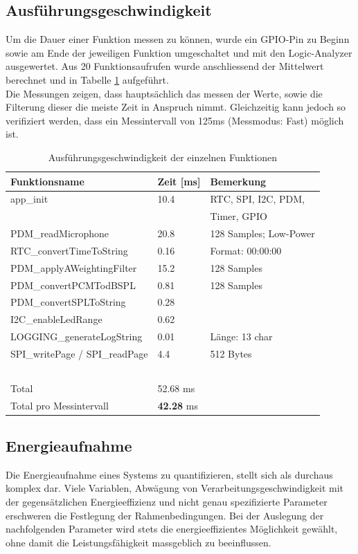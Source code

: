 \documentclass[12pt]{article}
\begin{document}
	\subsection{Ausführungsgeschwindigkeit}
	Um die Dauer einer Funktion messen zu können, wurde ein GPIO-Pin zu Beginn sowie am Ende der jeweiligen Funktion umgeschaltet und mit den Logic-Analyzer ausgewertet. Aus 20 Funktionsaufrufen wurde anschliessend der Mittelwert berechnet und in Tabelle \ref{tab:ausfuehrungsgeschwindigkeit} aufgeführt. \\
	Die Messungen zeigen, dass hauptsächlich das messen der Werte, sowie die Filterung dieser die meiste Zeit in Anspruch nimmt. Gleichzeitig kann jedoch so verifiziert werden, dass ein Messintervall von 125ms (Messmodus: Fast) möglich ist.
	\begin{table}[H]
		\centering
		\begin{tabular}{|l|l|l|}
			\hline
			\textbf{Funktionsname} & \textbf{Zeit [ms]} & \textbf{Bemerkung} \\ \hline
			app\_init & 10.4 & RTC, SPI, I2C, PDM, \\ 
			 ~ & ~ & Timer, GPIO \\ 
			 \hline
			PDM\_readMicrophone & 20.8 & 128 Samples; Low-Power \\ \hline
			RTC\_convertTimeToString & 0.16 & Format: 00:00:00 \\ \hline
			PDM\_applyAWeightingFilter & 15.2 & 128 Samples \\ \hline
			PDM\_convertPCMTodBSPL & 0.81 & 128 Samples \\ \hline
			PDM\_convertSPLToString & 0.28 & ~ \\ \hline
			I2C\_enableLedRange & 0.62 & ~ \\ \hline
			LOGGING\_generateLogString & 0.01 & Länge: 13 char \\ \hline
			SPI\_writePage / SPI\_readPage & 4.4 & 512 Bytes \\ \hline
			~ & ~ & ~ \\ \hline
			Total & 52.68 ms & ~ \\ \hline
			Total pro Messintervall & \textbf{42.28} ms & ~ \\ \hline
		\end{tabular}
		\caption{Ausführungsgeschwindigkeit der einzelnen Funktionen}
		\label{tab:ausfuehrungsgeschwindigkeit}
	\end{table}
	\subsection{Energieaufnahme}
	Die Energieaufnahme eines Systems zu quantifizieren, stellt sich als durchaus komplex dar. Viele Variablen, Abwägung von Verarbeitungsgeschwindigkeit mit der gegensätzlichen Energieeffizienz und nicht genau spezifizierte Parameter erschweren die Festlegung der Rahmenbedingungen. Bei der Auslegung der nachfolgenden Parameter wird stets die energieeffizientes Möglichkeit gewählt, ohne damit die Leistungsfähigkeit massgeblich zu beeinflussen.
\end{document}
